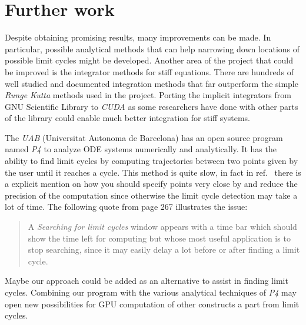 %
\section{Further work}%
\label{sec:future}

Despite obtaining promising results, many improvements can be made. In particular,  possible analytical methods that can help narrowing down locations of possible limit cycles might be developed. Another area of the project that could be improved is the integrator methods for stiff equations. There are hundreds of well studied and documented integration methods that far outperform the simple \emph{Runge Kutta} methods used in the project. Porting the implicit integrators from GNU Scientific Library to \emph{CUDA} as some researchers have done with other parts of the library \cite{rodrigo_gnu_2019} could enable much better integration for stiff systems.

The \emph{UAB} (Universitat Autonoma de Barcelona) has an open source program
named \emph{P4} \cite{saleta_oscarsaletap4_2018,saleta_computer_2018} to analyze ODE systems numerically and analytically. It has the ability to find limit cycles by computing trajectories between two points given by the user until it reaches a cycle. This method is quite slow, in fact in ref.~\cite{dumortier_examples_2006} there is a explicit mention on how you should specify points very close by and reduce the precision of the computation since otherwise the limit cycle detection may take a lot of time. The following quote
from page 267 illustrates the issue:

\begin{quote}
A \emph{Searching for limit cycles} window  appears  with  a  time  bar which  should show the time left for computing but whose most useful application is to stop searching, since it may easily delay a lot before or after finding a limit cycle.
\end{quote}

Maybe our approach could be added as an alternative to assist in finding limit cycles. Combining our program with the various analytical techniques of \emph{P4} may open new possibilities for GPU computation of other constructs a part from limit cycles. 